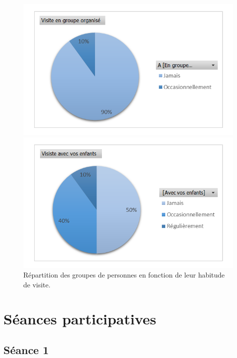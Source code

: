 \begin{figure}
\begin{minipage}{.49\textwidth}
\includegraphics[width=\textwidth]{figures/visitegroupe.png}
\end{minipage} \hfill
\begin{minipage}{.49\textwidth}
\includegraphics[width=\textwidth]{figures/visiteenfant.png}
\end{minipage}

\caption{Répartition des groupes de personnes en fonction de leur habitude de visite.}%
\label{fig:groupePersonnes}%
\end{figure}


\section{Séances participatives}

\subsection{Séance 1}

